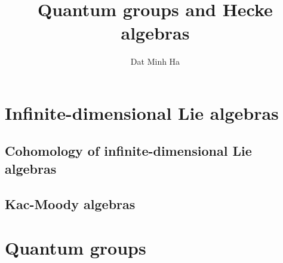 

\setcounter{chapter}{-1}
\setcounter{section}{-1}





    \title{Quantum groups and Hecke algebras}
    
    \author{Dat Minh Ha}
    \maketitle
    
    \begin{abstract}
        
    \end{abstract}
    
    {
      \hypersetup{} 
      \dominitoc
      \tableofcontents %
      \listoftodos
    }
    
    

    \part{Infinite-dimensional Lie algebras}
        \chapter{Cohomology of infinite-dimensional Lie algebras}
            \begin{abstract}
            
            \end{abstract}
            
            \minitoc
        
        \chapter{Kac-Moody algebras}
            \begin{abstract}
            
            \end{abstract}
            
            \minitoc

            

            
    
    \part{Quantum groups}
